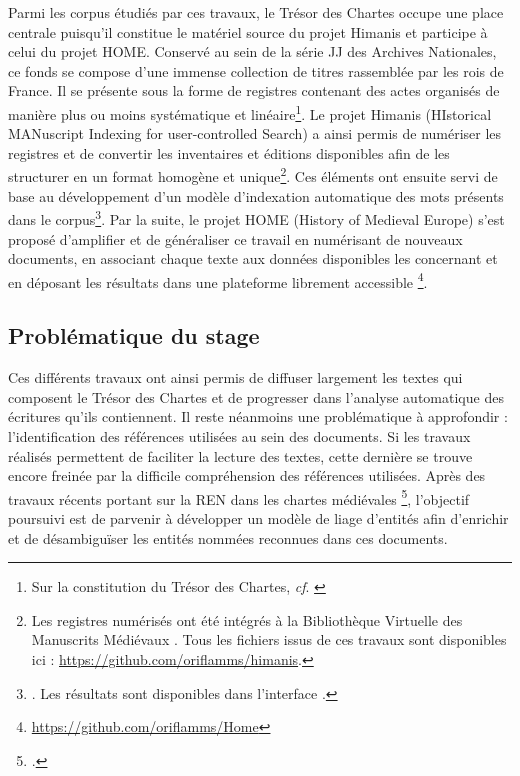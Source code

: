 \documentclass[a4paper,12pt,twoside]{book}
\begin{document}
	Parmi les corpus étudiés par ces travaux, le Trésor des Chartes occupe une place centrale puisqu'il constitue le matériel source du projet Himanis et participe à celui du projet HOME. Conservé au sein de la série JJ des Archives Nationales, ce fonds se compose d'une immense collection de titres rassemblée par les rois de France. Il se présente sous la forme de registres contenant des actes organisés de manière plus ou moins systématique et linéaire\footnote{Sur la constitution du Trésor des Chartes, \textit{cf}. \cite{potin_mise_2007}}. Le projet Himanis (HIstorical MANuscript Indexing for user-controlled Search) a ainsi permis de numériser les registres et de convertir les inventaires et éditions disponibles afin de les structurer en un format homogène et unique\footnote{Les registres numérisés ont été intégrés à la Bibliothèque Virtuelle des Manuscrits Médiévaux \cite{noauthor_bvmm_nodate}. Tous les fichiers issus de ces travaux sont disponibles ici : \url{https://github.com/oriflamms/himanis}.}. Ces éléments ont ensuite servi de base au développement d'un modèle d'indexation automatique des mots présents dans le corpus\footnote{\cites{stutzmann_recherche_2017}. Les résultats sont disponibles dans l'interface \cite{noauthor_himanis_nodate}.}. Par la suite, le projet HOME (History of Medieval Europe) s'est proposé d'amplifier et de généraliser ce travail en numérisant de nouveaux documents, en associant chaque texte aux données disponibles les concernant et en déposant les résultats dans une plateforme librement accessible \footnote{\url{https://github.com/oriflamms/Home}}.
	
	\subsection*{Problématique du stage}
	
	Ces différents travaux ont ainsi permis de diffuser largement les textes qui composent le Trésor des Chartes et de progresser dans l'analyse automatique des écritures qu'ils contiennent. Il reste néanmoins une problématique à approfondir : l'identification des références utilisées au sein des documents. Si les travaux réalisés permettent de faciliter la lecture des textes, cette dernière se trouve encore freinée par la difficile compréhension des références utilisées. Après des travaux récents portant sur la REN dans les chartes médiévales \footcite{torres_aguilar_named_2021}, l'objectif poursuivi est de parvenir à développer un modèle de liage d'entités afin d'enrichir et de désambiguïser les entités nommées reconnues dans ces documents. 
	
\end{document}
